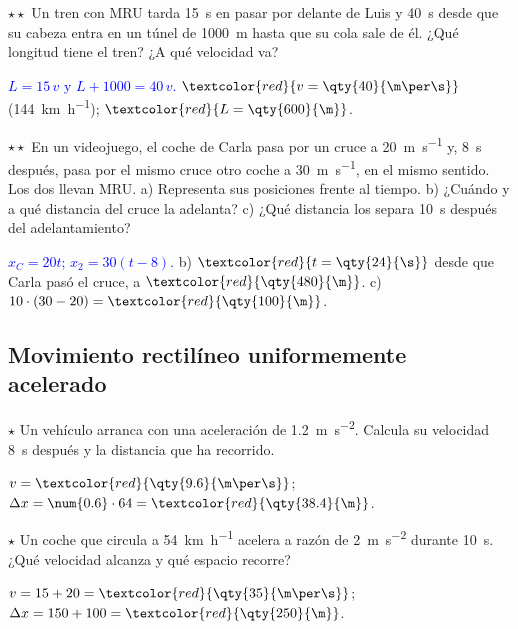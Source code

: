 \begin{exercise}
    \(\star\star\) Un tren con MRU tarda \qty{15}{\s} en pasar por delante de Luis y \qty{40}{\s} desde que su cabeza entra en un
    túnel de \qty{1000}{\m} hasta que su cola sale de él. ¿Qué longitud tiene el tren? ¿A qué velocidad va?
    \begin{solu}
        \textcolor{blue}{\(L = 15\,v\) y \(L + 1000 = 40\,v\).} \(\textcolor{red}{v = \qty{40}{\m\per\s}}\) (\qty{144}{\km\per\hour});
        \(\textcolor{red}{L = \qty{600}{\m}}\).
    \end{solu}
\end{exercise}

\begin{exercise}
    \(\star\star\) En un videojuego, el coche de Carla pasa por un cruce a \qty{20}{\m\per\s} y, \qty{8}{\s} después, pasa por el
    mismo cruce otro coche a \qty{30}{\m\per\s}, en el mismo sentido. Los dos llevan MRU. a) Representa sus posiciones frente al
    tiempo. b) ¿Cuándo y a qué distancia del cruce la adelanta? c) ¿Qué distancia los separa \qty{10}{\s} después del adelantamiento?
    \begin{solu}
        \textcolor{blue}{\(x_C = 20t\); \(x_2 = 30(t - 8)\).} b) \(\textcolor{red}{t = \qty{24}{\s}}\) desde que Carla pasó el cruce, a
        \(\textcolor{red}{\qty{480}{\m}}\). c) \(10 \cdot (30 - 20) = \textcolor{red}{\qty{100}{\m}}\).
    \end{solu}
\end{exercise}

\subsection{Movimiento rectilíneo uniformemente acelerado}

\begin{exercise}
    \(\star\) Un vehículo arranca con una aceleración de \qty{1.2}{\m\per\s\squared}. Calcula su velocidad \qty{8}{\s} después y la
    distancia que ha recorrido.
    \begin{solu}
        \(v = \textcolor{red}{\qty{9.6}{\m\per\s}}\); \(\Delta x = \num{0.6} \cdot 64 = \textcolor{red}{\qty{38.4}{\m}}\).
    \end{solu}
\end{exercise}

\begin{exercise}
    \(\star\) Un coche que circula a \qty{54}{\km\per\hour} acelera a razón de \qty{2}{\m\per\s\squared} durante \qty{10}{\s}.
    ¿Qué velocidad alcanza y qué espacio recorre?
    \begin{solu}
        \(v = 15 + 20 = \textcolor{red}{\qty{35}{\m\per\s}}\); \(\Delta x = 150 + 100 = \textcolor{red}{\qty{250}{\m}}\).
    \end{solu}
\end{exercise}


